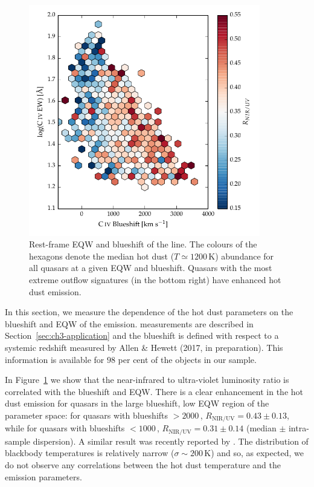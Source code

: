 \begin{figure}[t!]
\centering
  \includegraphics[width=0.9\textwidth]{figures/chapter05/hot_dust_ratio.pdf}
\caption[{Hot dust abundance as a function of rest-frame EQW and blueshift of the  line.}]{Rest-frame EQW and blueshift of the  line. The colours of the hexagons denote the median hot dust ($T\simeq1200$\,K) abundance for all quasars at a given EQW and blueshift. Quasars with the most extreme outflow signatures (in the bottom right) have enhanced hot dust emission.}
  \label{fig:civ_hot_dust}
\end{figure}

In this section, we measure the dependence of the hot dust parameters on the blueshift and EQW of the  emission. 
 measurements are described in Section~\ref{sec:ch3-application} and the  blueshift is defined with respect to a systemic redshift measured by Allen \& Hewett (2017, in preparation). 
This information is available for $98$ per cent of the objects in our sample. 

In Figure~\ref{fig:civ_hot_dust} we show that the near-infrared to ultra-violet luminosity ratio is correlated with the  blueshift and EQW. 
There is a clear enhancement in the hot dust emission for quasars in the large  blueshift, low EQW region of the parameter space: for quasars with  blueshifts $>2000$\,\kms, $R_{\text{NIR/UV}}=0.43\pm0.13$, while for quasars with  blueshifts $<1000$\,\kms, $R_{\text{NIR/UV}}=0.31\pm0.14$ (median $\pm$ intra-sample dispersion).
A similar result was recently reported by \citet{wang13}. 
The distribution of blackbody temperatures is relatively narrow ($\sigma\sim200$\,K) and so, as expected, we do not observe any correlations between the hot dust temperature and the  emission parameters. 

